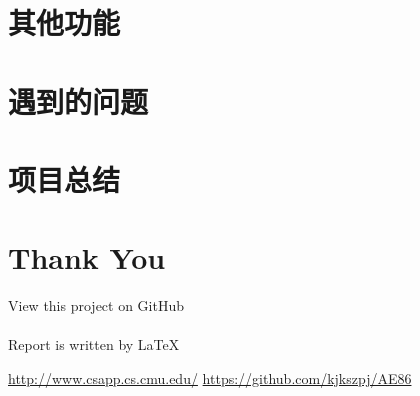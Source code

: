 \documentclass{article}
\begin{document}
\section{其他功能}
\section{遇到的问题}
\section{项目总结}
\section{Thank You}
\indent\indent
{\Large{View this project on GitHub\cite{2}}
\\
\\
\indent\Large{Report is written by \LaTeX}}

\begin{thebibliography}{99}
 \url{http://www.csapp.cs.cmu.edu/}
 \url{https://github.com/kjkszpj/AE86}
\end{thebibliography}
\end{document}
